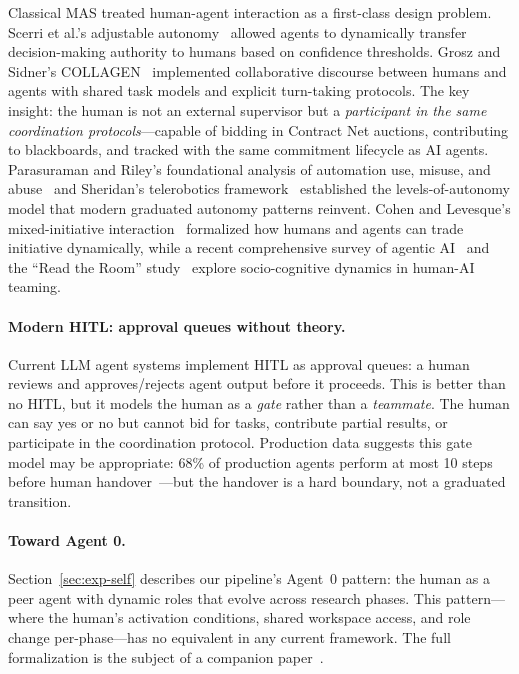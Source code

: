 \documentclass{article}
\begin{document}
Classical MAS treated human-agent interaction as a first-class design problem. Scerri
et al.'s adjustable autonomy~\citep{scerri2002adjustable} allowed agents to dynamically
transfer decision-making authority to humans based on confidence thresholds. Grosz and
Sidner's COLLAGEN~\citep{rich2001collagen} implemented collaborative discourse between
humans and agents with shared task models and explicit turn-taking protocols. The key
insight: the human is not an external supervisor but a \emph{participant in the same
coordination protocols}---capable of bidding in Contract Net auctions, contributing to
blackboards, and tracked with the same commitment lifecycle as AI agents.
Parasuraman and Riley's foundational analysis of automation use, misuse, and
abuse~\citep{sutra13784_humans1997} and Sheridan's telerobotics
framework~\citep{sutra13761_telerobotics1992} established the levels-of-autonomy
model that modern graduated autonomy patterns reinvent. Cohen and
Levesque's mixed-initiative interaction~\citep{sutra13777_mixedinitiative1999}
formalized how humans and agents can trade initiative dynamically, while a recent
comprehensive survey of agentic AI~\citep{sutra14383_role2025} and the ``Read the
Room'' study~\citep{sutra7239_read2025} explore socio-cognitive dynamics in
human-AI teaming.

\paragraph{Modern HITL: approval queues without theory.}
Current LLM agent systems implement HITL as approval queues: a human reviews and
approves/rejects agent output before it proceeds. This is better than no HITL, but it
models the human as a \emph{gate} rather than a \emph{teammate}. The human can say yes
or no but cannot bid for tasks, contribute partial results, or participate in the
coordination protocol. Production data suggests this gate model may be appropriate:
68\% of production agents perform at most 10 steps before human
handover~\citep{anthropic2025building}---but the handover is a hard boundary, not a
graduated transition.

\paragraph{Toward Agent 0.}
Section~\ref{sec:exp-self} describes our pipeline's Agent~0 pattern: the human as a
peer agent with dynamic roles that evolve across research phases. This pattern---where
the human's activation conditions, shared workspace access, and role change
per-phase---has no equivalent in any current framework. The full formalization is the
subject of a companion paper~\citep{viswanathan2026agent0}.
\end{document}
